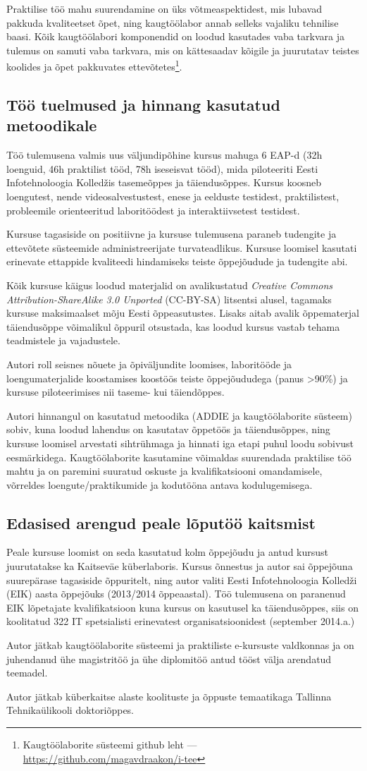 Praktilise töö mahu suurendamine on üks võtmeaspektidest, mis lubavad pakkuda kvaliteetset õpet, ning kaugtöölabor annab selleks vajaliku tehnilise baasi. Kõik kaugtöölabori komponendid on loodud kasutades vaba tarkvara ja tulemus on samuti vaba tarkvara, mis on kättesaadav kõigile ja juurutatav teistes koolides ja õpet pakkuvates ettevõtetes\footnote{Kaugtöölaborite süsteemi github leht --- \url{https://github.com/magavdraakon/i-tee}}.


\subsection*{Töö tuelmused ja hinnang kasutatud metoodikale}
Töö tulemusena valmis uus väljundipõhine kursus mahuga 6 EAP-d (32h loenguid, 46h praktilist tööd, 78h iseseisvat tööd), mida piloteeriti Eesti Infotehnoloogia Kolledžis tasemeõppes ja täiendusõppes. Kursus koosneb loengutest, nende videosalvestustest, enese ja eelduste testidest, praktilistest, probleemile orienteeritud laboritöödest ja interaktiivsetest testidest.

Kursuse tagasiside on positiivne ja kursuse tulemusena paraneb tudengite ja ettevõtete süsteemide administreerijate turvateadlikus.
Kursuse loomisel kasutati erinevate ettappide kvaliteedi hindamiseks teiste õppejõudude ja tudengite abi.


Kõik kursuse käigus loodud materjalid on avalikustatud \emph{Creative Commons Attribution-ShareAlike 3.0 Unported} (\gls{CC-BY-SA}) litsentsi alusel, tagamaks kursuse maksimaalset mõju Eesti õppeasutustes. Lisaks aitab avalik õppematerjal täiendusõppe võimalikul õppuril otsustada, kas loodud kursus vastab tehama teadmistele ja vajadustele.
 
Autori roll seisnes nõuete ja õpiväljundite loomises, laboritööde ja loengumaterjalide koostamises koostöös teiste õppejõududega (panus >90\%) ja kursuse piloteerimises nii taseme- kui täiendõppes.

Autori hinnangul on kasutatud metoodika (\gls{ADDIE} ja kaugtöölaborite süsteem) sobiv, kuna loodud lahendus on kasutatav õppetöös ja täiendusõppes, ning kursuse loomisel arvestati sihtrühmaga ja hinnati iga etapi puhul loodu sobivust eesmärkidega. Kaugtöölaborite kasutamine võimaldas suurendada praktilise töö mahtu ja on paremini suuratud oskuste ja kvalifikatsiooni omandamisele, võrreldes loengute/praktikumide ja kodutööna antava kodulugemisega.


\subsection*{Edasised arengud peale lõputöö kaitsmist}
Peale kursuse loomist on seda kasutatud kolm õppejõudu ja antud kursust juurutatakse ka Kaitseväe küberlaboris. Kursus õnnestus ja autor sai õppejõuna suurepärase tagasiside õppuritelt, ning autor valiti Eesti Infotehnoloogia Kolledži (\gls{EIK})  aasta õppejõuks (2013/2014 õppeaastal). 
Töö tulemusena on paranenud \gls{EIK} lõpetajate kvalifikatsioon kuna kursus on kasutusel ka täiendusõppes, siis on koolitatud 322 IT spetsialisti erinevatest organisatsioonidest (september 2014.a.)

Autor jätkab kaugtöölaborite süsteemi ja praktiliste e-kursuste valdkonnas ja on juhendanud ühe magistritöö ja ühe diplomitöö antud tööst välja arendatud teemadel.

Autor jätkab küberkaitse alaste koolituste ja õppuste temaatikaga Tallinna Tehnikaülikooli doktoriõppes.
